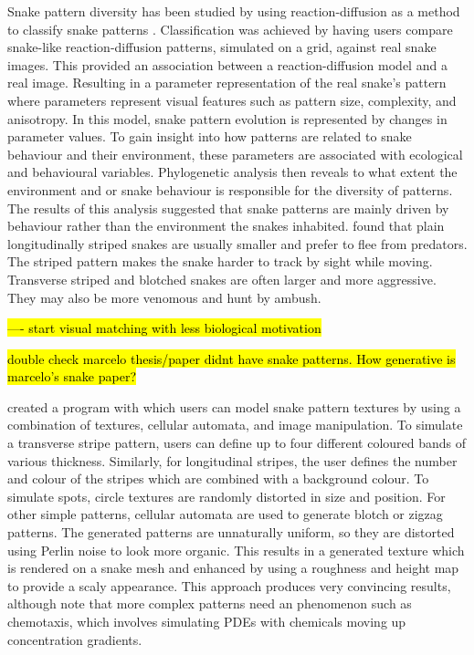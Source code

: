 Snake pattern diversity has been studied by using reaction-diffusion as a method to classify snake patterns \citep{Allen2013}. Classification was achieved by having users compare snake-like reaction-diffusion patterns, simulated on a grid, against real snake images. This provided an association between a reaction-diffusion model and a real image. Resulting in a parameter representation of the real snake’s pattern where parameters represent visual features such as pattern size, complexity, and anisotropy. In this model, snake pattern evolution is represented by changes in parameter values. To gain insight into how patterns are related to snake behaviour and their environment, these parameters are associated with ecological and behavioural variables. Phylogenetic analysis then reveals to what extent the environment and or  snake behaviour is responsible for the diversity of patterns. The results of this analysis suggested that snake patterns are mainly driven by behaviour rather than the environment the snakes inhabited. \citet{Allen2013} found that plain longitudinally striped snakes are usually smaller and prefer to flee from predators. The striped pattern makes the snake harder to track by sight while moving. Transverse striped and blotched snakes are often larger and more aggressive. They may also be more venomous and hunt by ambush.

\hl{---- start visual matching with less biological motivation}


\hl{double check marcelo thesis/paper didnt have snake patterns. How generative is marcelo's snake paper?}

\citet{pinheiro2017} created a program with which users can model snake pattern textures by using a combination of textures, cellular automata, and image manipulation. To simulate a transverse stripe pattern, users can define up to four different coloured bands of various thickness. Similarly, for longitudinal stripes, the user defines the number and colour of the stripes which are combined with a background colour. To simulate spots, circle textures are randomly distorted in size and position. For other simple patterns, cellular automata are used to generate blotch or zigzag patterns. The generated patterns are unnaturally uniform, so they are distorted using Perlin noise to look more organic. This results in a generated texture which is rendered on a snake mesh and enhanced by using a roughness and height map to provide a scaly appearance. This approach produces very convincing results, although \citet{pinheiro2017} note that more complex patterns need an phenomenon such as chemotaxis, which involves simulating PDEs with chemicals moving up concentration gradients.


